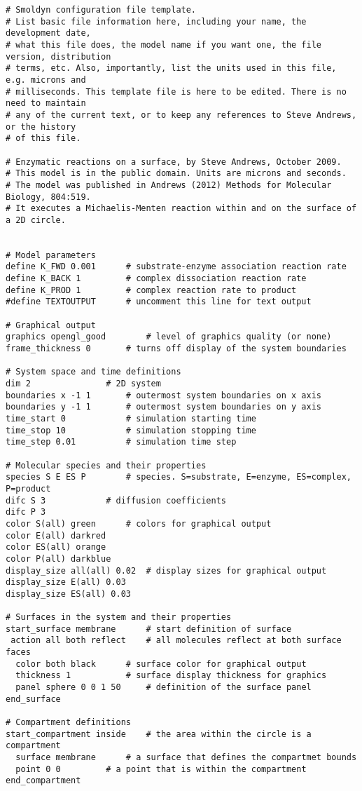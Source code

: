 \documentclass {scrbook}
\begin{document}
\begin{lstlisting}[style=SSAC]
# Smoldyn configuration file template.
# List basic file information here, including your name, the development date,
# what this file does, the model name if you want one, the file version, distribution
# terms, etc. Also, importantly, list the units used in this file, e.g. microns and
# milliseconds. This template file is here to be edited. There is no need to maintain
# any of the current text, or to keep any references to Steve Andrews, or the history
# of this file.

# Enzymatic reactions on a surface, by Steve Andrews, October 2009.
# This model is in the public domain. Units are microns and seconds.
# The model was published in Andrews (2012) Methods for Molecular Biology, 804:519.
# It executes a Michaelis-Menten reaction within and on the surface of a 2D circle.


# Model parameters
define K_FWD 0.001		# substrate-enzyme association reaction rate
define K_BACK 1			# complex dissociation reaction rate
define K_PROD 1			# complex reaction rate to product
#define TEXTOUTPUT		# uncomment this line for text output

# Graphical output
graphics opengl_good		# level of graphics quality (or none)
frame_thickness 0		# turns off display of the system boundaries

# System space and time definitions
dim 2				# 2D system
boundaries x -1 1		# outermost system boundaries on x axis
boundaries y -1 1		# outermost system boundaries on y axis
time_start 0			# simulation starting time
time_stop 10			# simulation stopping time
time_step 0.01			# simulation time step

# Molecular species and their properties
species S E ES P		# species. S=substrate, E=enzyme, ES=complex, P=product
difc S 3			# diffusion coefficients
difc P 3
color S(all) green		# colors for graphical output
color E(all) darkred
color ES(all) orange
color P(all) darkblue
display_size all(all) 0.02	# display sizes for graphical output
display_size E(all) 0.03
display_size ES(all) 0.03

# Surfaces in the system and their properties
start_surface membrane		# start definition of surface
 action all both reflect	# all molecules reflect at both surface faces
  color both black		# surface color for graphical output
  thickness 1			# surface display thickness for graphics
  panel sphere 0 0 1 50		# definition of the surface panel
end_surface

# Compartment definitions
start_compartment inside	# the area within the circle is a compartment
  surface membrane		# a surface that defines the compartmet bounds
  point 0 0			# a point that is within the compartment
end_compartment


\end{lstlisting}
\end{document}
